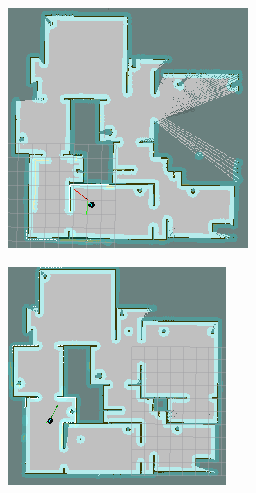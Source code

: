 \documentclass[17pt, a0paper, portrait]{tikzposter}
\begin{document}
\begin{columns}
{\begin{tikzfigure}
\begin{minipage}[t]{0.24\linewidth}
\begin{tikzfigure}
            \includegraphics[width=\linewidth]{../img/minimal-overlapping-area-robot1.png}
        \end{tikzfigure}
    \end{minipage}
    \begin{minipage}[t]{0.24\linewidth}
        \begin{tikzfigure}
            \centering
            \includegraphics[width=\linewidth]{../img/minimal-overlapping-area-robot2.png}

\end{tikzfigure}
\end{minipage}
\end{tikzfigure}}
\end{columns}
\end{document}
